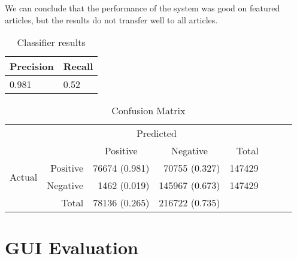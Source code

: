 We can conclude that the performance of the system was good on featured articles, but the results do not transfer well to all articles.

\begin{table}[htbp]
\centering
\begin{tabular}{@{}ll@{}}
\toprule
Precision     & Recall       \\ \midrule
\num{0.981} & \num{0.52}
\end{tabular}
\caption{Classifier results}\label{eval-results}
\end{table}

\begin{table}[htbp]
    \centering
     \begin{tabular}{rrrrrrrr}
      \toprule
      \multicolumn{2}{c}{} & \multicolumn{2}{c}{Predicted} & \\
      \cmidrule{3-4}
      \multicolumn{2}{c}{} & \multicolumn{1}{c}{Positive} & \multicolumn{1}{c}{Negative} & Total \\
      \midrule
      \multirow{2}{*}{Actual} & Positive & \num{76674} (0.981) & \num{70755} (0.327)  & \num{147429} \\
                              & Negative & \num{1462} (0.019)  & \num{145967} (0.673) & \num{147429} \\ \cmidrule{1-2}
                              & Total    & \num{78136} (0.265) & \num{216722} (0.735) \\
      \bottomrule
    \end{tabular}
    \caption[Confusion Matrix]{Confusion Matrix}%
    \label{tab:confusionmatrix}
\end{table}

\section{GUI Evaluation}